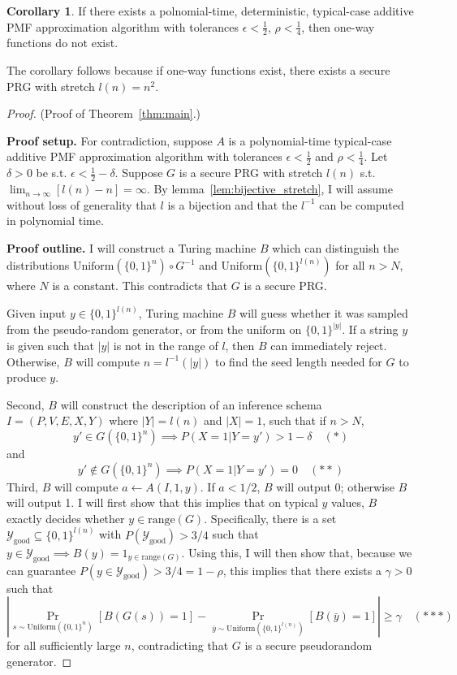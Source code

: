 \documentclass{article}
\def \Ygood{\mathcal{Y}_\text{good}}
\def \by{{\bar{y}}}
\theoremstyle{definition}
\newtheorem{cor}[thm]{Corollary}
\theoremstyle{remark}
\begin{document}
\begin{cor}
If there exists a polnomial-time, deterministic, typical-case additive PMF approximation algorithm with tolerances $\epsilon < \frac{1}{2}$, $\rho < \frac{1}{4}$,
then one-way functions do not exist.
\end{cor}
\noindent The corollary follows because if one-way functions exist, there exists a secure PRG with stretch $l(n) = n^2$.

\begin{proof}{(Proof of Theorem~\ref{thm:main}.)}

\medskip
\noindent \textbf{Proof setup.}
For contradiction, suppose $A$ is a polynomial-time typical-case additive PMF approximation algorithm with tolerances $\epsilon < \frac{1}{2}$ and $\rho < \frac{1}{4}$.
Let $\delta > 0$ be s.t. $\epsilon < \frac{1}{2} - \delta$.
Suppose $G$ is a secure PRG with stretch $l(n)$ s.t. $\lim_{n \to \infty} [l(n) - n] = \infty$.
By lemma~\ref{lem:bijective_stretch}, I will assume without loss of generality that $l$ is a bijection and that the $l^{-1}$ can be computed in polynomial time.

\medskip
\noindent \textbf{Proof outline.}
I will construct a Turing machine $B$ which can distinguish the distributions $\text{Uniform}(\{0, 1\}^n) \circ G^{-1}$ and $\text{Uniform}(\{0, 1\}^{l(n)})$ for all $n > N$, where $N$ is a constant.  This contradicts that $G$ is a secure PRG.

Given input $y \in \{0, 1\}^{l(n)}$,
Turing machine $B$ will guess whether it was sampled from the pseudo-random generator, or from the uniform on $\{0, 1\}^{|y|}$.
If a string $y$ is given such that $|y|$ is not in the range of $l$, then $B$ can immediately reject.
Otherwise, $B$ will compute $n = l^{-1}(|y|)$ to find the seed length needed for $G$ to produce $y$.

Second, $B$ will construct the description of an inference schema $I = (P, V, E, X, Y)$ where $|Y| = l(n)$ and $|X| = 1$, such that if $n > N$,
$$
y' \in G(\{0, 1\}^n) \implies P(X = 1 | Y = y') > 1 - \delta \quad (*)
$$
and
$$
y' \notin G(\{0, 1\}^n) \implies P(X = 1 | Y = y') = 0 \quad (**)
$$
Third, $B$ will compute $a \gets A(I, 1, y)$.
If $a < 1/2$, $B$ will output 0; otherwise $B$ will output 1.
I will first show that this implies that on typical $y$ values,
$B$ exactly decides whether $y \in \text{range}(G)$.
Specifically, there is a set $\Ygood \subseteq \{0, 1\}^{l(n)}$ with $P(\Ygood) > 3/4$ such that
$y \in \Ygood \implies B(y) = 1_{y \in \text{range}(G)}$.
Using this,
I will then show that, because we can guarantee $P(y \in \Ygood) > 3/4 = 1 - \rho$,
this implies that there exists a $\gamma > 0$ such that
$$
|\Pr_{s \sim \text{Uniform}(\{0, 1\}^n)}[B(G(s)) = 1] - \Pr_{\by \sim \text{Uniform}(\{0, 1\}^{l(n)})}[B(\by) = 1]| \geq \gamma \quad (***)
$$
for all sufficiently large $n$, contradicting that $G$ is a secure pseudorandom generator.


\end{proof}
\end{document}
